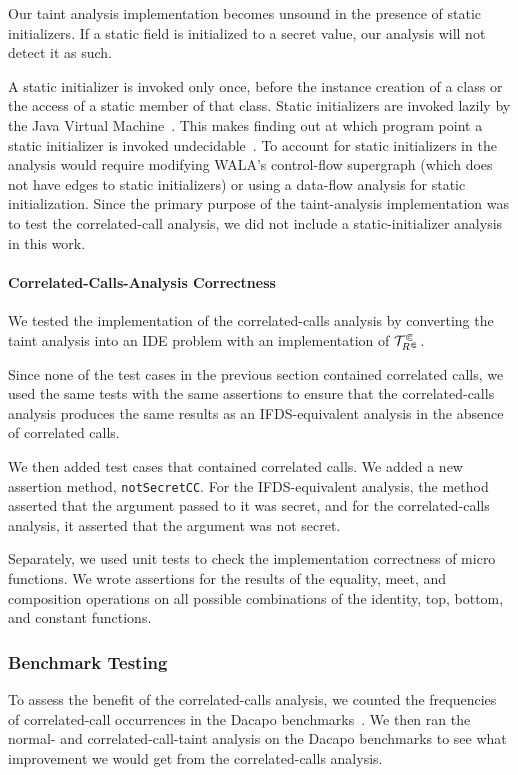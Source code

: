 Our taint analysis implementation becomes unsound in the presence of static initializers. If a static field is initialized to a secret value, our analysis will not detect it as such.

A static initializer is invoked only once, before the instance creation of a class or the access of a static member of that class.
Static initializers are invoked lazily by the Java Virtual Machine~\cite{lindholmjava}. This makes finding out at which program point a static initializer is invoked undecidable~\cite{hubert2009soundly}. To account for static initializers in the analysis would require modifying WALA's control-flow supergraph (which does not have edges to static initializers) or using a data-flow analysis for static initialization. Since the primary purpose of the taint-analysis implementation was to test the correlated-call analysis, we did not include a static-initializer analysis in this work.

\paragraph{Correlated-Calls-Analysis Correctness}
We tested the implementation of the correlated-calls analysis by converting the taint analysis into an IDE problem with an implementation of $\mathcal T^\Subset_{R^\Subset}$.

Since none of the test cases in the previous section contained correlated calls, we used the same tests with the same assertions to ensure that the correlated-calls analysis produces the same results as an IFDS-equivalent analysis in the absence of correlated calls.

We then added test cases that contained correlated calls. We added a new assertion method, \verb'notSecretCC'. For the IFDS-equivalent analysis, the method asserted that the argument passed to it was secret, and for the correlated-calls analysis, it asserted that the argument was not secret.

Separately, we used unit tests to check the implementation correctness of micro functions. We wrote assertions for the results of the equality, meet, and composition operations on all possible combinations of the identity, top, bottom, and constant functions.

\subsubsection{Benchmark Testing}
To assess the benefit of the correlated-calls analysis, we counted the frequencies of correlated-call occurrences in the Dacapo benchmarks~\cite{blackburn2006dacapo}. We then ran the normal- and correlated-call-taint analysis on the Dacapo benchmarks to see what improvement we would get from the correlated-calls analysis.

